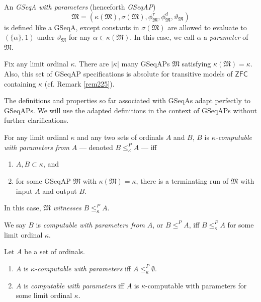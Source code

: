 \documentclass[12pt]{article}
\numberwithin{equation}{section}
\begin{document}
\begin{defi}\label{def836}
An \emph{GSeqA with parameters} (henceforth \emph{GSeqAP}) 
\begin{equation*}
    \mathfrak{M} = (\kappa(\mathfrak{M}), \sigma(\mathfrak{M}), \phi^{\tau}_{\mathfrak{M}}, \phi^d_{\mathfrak{M}}, \vartheta_{\mathfrak{M}})
\end{equation*} 
is defined like a GSeqA, except constants in $\sigma(\mathfrak{M})$ are allowed to evaluate to $(\{\alpha\}, 1)$ under $\vartheta_{\mathfrak{M}}$ for any $\alpha \in \kappa(\mathfrak{M})$. In this case, we call $\alpha$ a \emph{parameter} of $\mathfrak{M}$.
\end{defi}

\begin{rem}\label{rem248}
Fix any limit ordinal $\kappa$. There are $|\kappa|$ many GSeqAPs $\mathfrak{M}$ satisfying $\kappa(\mathfrak{M}) = \kappa$. Also, this set of GSeqAP specifications is absolute for transitive models of $\mathsf{ZFC}$ containing $\kappa$ (cf. Remark \ref{rem225}).
\end{rem}

The definitions and properties so far associated with GSeqAs adapt perfectly to GSeqAPs. We will use the adapted definitions in the context of GSeqAPs without further clarifications.

\begin{defi}\label{def38}
For any limit ordinal $\kappa$ and any two sets of ordinals $A$ and $B$, $B$ is $\kappa$\emph{-computable with parameters from} $A$ --- denoted $B \leq^P_{\kappa} A$ --- iff 
\begin{enumerate}[label=(\alph*)]
    \item $A, B \subset \kappa$, and
    \item for some GSeqAP $\mathfrak{M}$ with $\kappa(\mathfrak{M}) = \kappa$, there is a terminating run of $\mathfrak{M}$ with input $A$ and output $B$. 
\end{enumerate}
In this case, $\mathfrak{M}$ \emph{witnesses} $B \leq^P_{\kappa} A$.
\end{defi}

\begin{defi}\label{def839}
We say $B$ is \emph{computable with parameters from} $A$, or $B \leq^P A$, iff $B \leq^P_{\kappa} A$ for some limit ordinal $\kappa$.
\end{defi}

\begin{defi}
Let $A$ be a set of ordinals.
\begin{enumerate}[label=(\arabic*)]
    \item $A$ is $\kappa$\emph{-computable with parameters} iff $A \leq^P_{\kappa} \emptyset$.
    \item $A$ is \emph{computable with parameters} iff $A$ is $\kappa$-computable with parameters for some limit ordinal $\kappa$.
\end{enumerate}
\end{defi}
\end{document}
